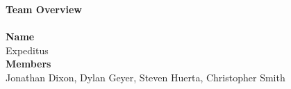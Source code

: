

\LARGE{\textbf{Team Overview}}
\\[-3mm]\noindent\makebox[\linewidth]{\rule{\textwidth}{0.4pt}}
\\[3mm]
\Large{\textbf{Name}}
\\ Expeditus 
\\[3mm]
\Large{\textbf{Members}}
\\ Jonathan Dixon, Dylan Geyer, Steven Huerta, Christopher Smith
\\[3mm]

